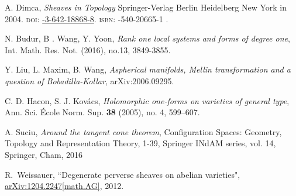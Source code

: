 \documentclass[12pt,reqno]{amsart}
\theoremstyle{question}
\theoremstyle{definition}
\theoremstyle{remark}
\theoremstyle{cited}
\theoremstyle{citeddef}
\begin{document}
\begin{thebibliography}{ADMSP}
 A. Dimca, {\it Sheaves in Topology} Springer-Verlag Berlin Heidelberg New York in 2004.
\textsc{doi:} \href{https://doi.org/10.10071978-3-642-18868-8}{-3-642-18868-8}.
\textsc{isbn:} {-540-20665-1 }.

 N. Budur, B . Wang, Y. Yoon, {\it Rank one local systems and forms of degree one}, Int. Math. Res. Not. (2016), no.13, 3849-3855.

%
 Y. Liu, L. Maxim, B. Wang, \textit{Aspherical manifolds, Mellin transformation and a question of Bobadilla-Kollar}, arXiv:2006.09295.

 C. D. Hacon, S. J. Kov\'acs, \textit{Holomorphic one-forms on varieties of general type}, Ann. Sci. \'Ecole Norm. Sup. \textbf{38} (2005), no. 4, 599--607.


 A. Suciu, {\it Around the tangent cone theorem}, Configuration Spaces: Geometry, Topology and Representation Theory, 1-39, Springer INdAM series, vol. 14, Springer, Cham, 2016

 R.\ Weissauer, ``Degenerate perverse sheaves on abelian varieties", \href{https://arxiv.org/abs/1204.2247}{\ttfamily arXiv:1204.2247[math.AG]}, 2012.




\end{thebibliography}



\end{document}

